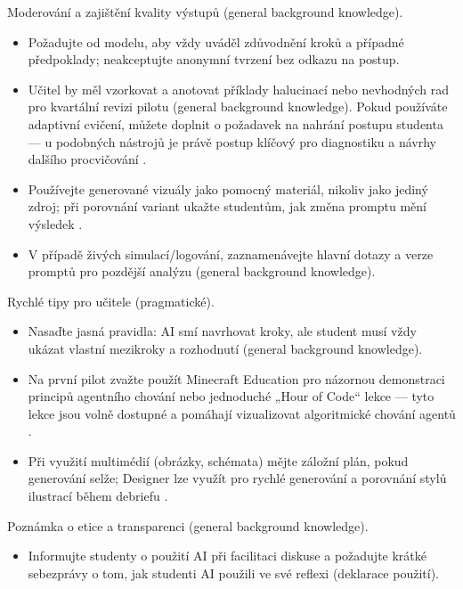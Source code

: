 Moderování a zajištění kvality výstupů (general background knowledge).
\begin{itemize}
  \item Požadujte od modelu, aby vždy uváděl zdůvodnění kroků a případné předpoklady; neakceptujte anonymní tvrzení bez odkazu na postup.
  \item Učitel by měl vzorkovat a anotovat příklady halucinací nebo nevhodných rad pro kvartální revizi pilotu (general background knowledge). Pokud používáte adaptivní cvičení, můžete doplnit o požadavek na nahrání postupu studenta — u podobných nástrojů je právě postup klíčový pro diagnostiku a návrhy dalšího procvičování \cite{kb_ai_101_tipu_pdf_04e4a115_page_8_1}.
  \item Používejte generované vizuály jako pomocný materiál, nikoliv jako jediný zdroj; při porovnání variant ukažte studentům, jak změna promptu mění výsledek \cite{kb_ai_101_tipu_pdf_04e4a115_page_51_1}.
  \item V případě živých simulací/logování, zaznamenávejte hlavní dotazy a verze promptů pro pozdější analýzu (general background knowledge).
\end{itemize}

Rychlé tipy pro učitele (pragmatické).
\begin{itemize}
  \item Nasaďte jasná pravidla: AI smí navrhovat kroky, ale student musí vždy ukázat vlastní mezikroky a rozhodnutí (general background knowledge).
  \item Na první pilot zvažte použít Minecraft Education pro názornou demonstraci principů agentního chování nebo jednoduché „Hour of Code“ lekce — tyto lekce jsou volně dostupné a pomáhají vizualizovat algoritmické chování agentů \cite{kb_ai_101_tipu_pdf_04e4a115_page_15_2}.
  \item Při využití multimédií (obrázky, schémata) mějte záložní plán, pokud generování selže; Designer lze využít pro rychlé generování a porovnání stylů ilustrací během debriefu \cite{kb_ai_101_tipu_pdf_04e4a115_page_51_1}.
\end{itemize}

Poznámka o etice a transparenci (general background knowledge).
\begin{itemize}
  \item Informujte studenty o použití AI při facilitaci diskuse a požadujte krátké sebezprávy o tom, jak studenti AI použili ve své reflexi (deklarace použití).
\end{itemize}